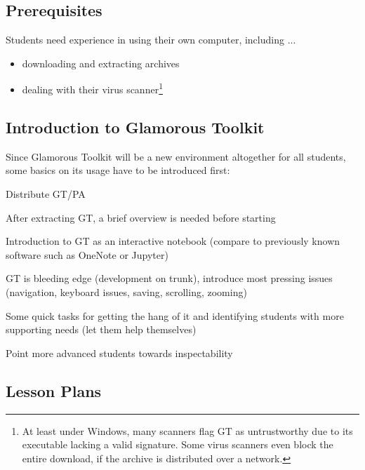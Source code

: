 \subsection{Prerequisites}

Students need experience in using their own computer, including ...
\begin{itemize}
\item downloading and extracting archives
\item dealing with their virus scanner\footnote{At least under Windows, many scanners flag GT as untrustworthy due to its executable lacking a valid signature. Some virus scanners even block the entire download, if the archive is distributed over a network.}
\end{itemize}


\subsection{Introduction to Glamorous Toolkit} \label{ssc_lesson_gt}

Since Glamorous Toolkit will be a new environment altogether for all students, some basics on its usage have to be introduced first:

\begin{todo}
\item Distribute GT/PA
\item After extracting GT, a brief overview is needed before starting
\item Introduction to GT as an interactive notebook (compare to previously known software such as OneNote or Jupyter)
\item GT is bleeding edge (development on trunk), introduce most pressing issues (navigation, keyboard issues, saving, scrolling, zooming)
\item Some quick tasks for getting the hang of it and identifying students with more supporting needs (let them help themselves)
\item Point more advanced students towards inspectability
\end{todo}


\subsection{Lesson Plans}


